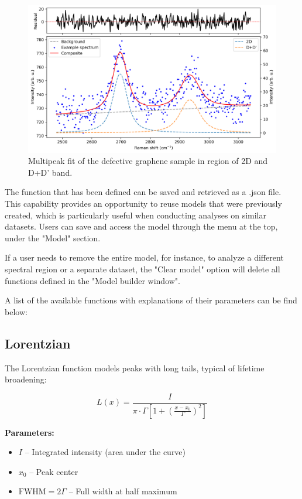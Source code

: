 \begin{figure}[H]
    \centering
    \includegraphics[width=0.75\linewidth]{Resources/multipeak_fit.png}
    \caption{Multipeak fit of the defective graphene sample in region of 2D and D+D' band.}
    \label{multipeak_fit}
\end{figure}
\par
The function that has been defined can be saved and retrieved as a .json file. This capability provides an opportunity to reuse models that were previously created, which is particularly useful when conducting analyses on similar datasets. Users can save and access the model through the menu at the top, under the "Model" section.
\par
If a user needs to remove the entire model, for instance, to analyze a different spectral region or a separate dataset, the "Clear model" option will delete all functions defined in the "Model builder window".
\par
A list of the available functions with explanations of their parameters can be find below:
\subsection{Lorentzian}
The Lorentzian function models peaks with long tails, typical of lifetime broadening:

\begin{equation}
L(x) = \frac{I}{\pi \cdot \Gamma \left[1 + \left(\frac{x - x_0}{\Gamma}\right)^2 \right]}
\end{equation}

\textbf{Parameters:}
\begin{itemize}
    \item $I$ – Integrated intensity (area under the curve)
    \item $x_0$ – Peak center
    \item $\mathrm{FWHM} = 2\Gamma$ – Full width at half maximum
\end{itemize}

